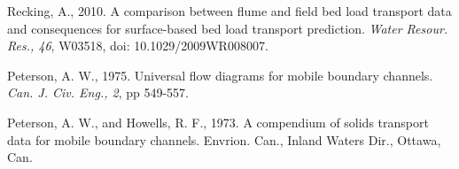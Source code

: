 \documentclass[11pt]{article}
\begin{document}
\begin{thebibliography}{3}

Recking, A., 2010. A comparison between flume and field bed load transport data and consequences for surface-based bed load transport prediction. \textsl{Water Resour. Res., 46}, W03518, doi: 10.1029/2009WR008007.

Peterson, A. W., 1975. Universal flow diagrams for mobile boundary channels. \textsl{Can. J. Civ. Eng., 2}, pp 549-557.

Peterson, A. W., and Howells, R. F., 1973. A compendium of solids transport data for mobile boundary channels.  Envrion. Can., Inland Waters Dir., Ottawa, Can. 

%
%
%
%
%
%

\end{thebibliography}
\end{document}
